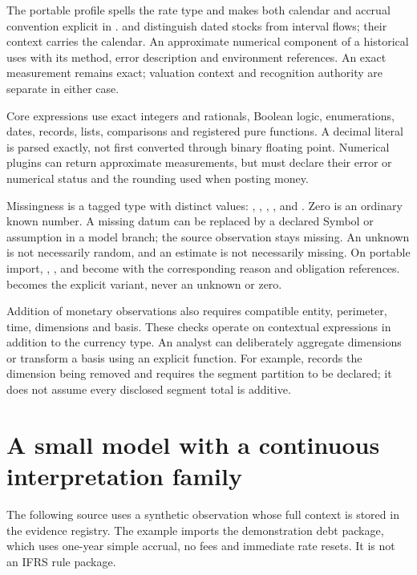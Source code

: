 The portable profile spells the rate type  and makes
both calendar and accrual convention explicit in
.  and
\code{Flow<T, [start,end)>} distinguish dated stocks from interval flows;
their context carries the calendar. An approximate numerical component of a
historical  uses  with its method,
error description and environment references. An exact measurement remains
exact; valuation context and recognition authority are separate in either case.

Core expressions use exact integers and rationals, Boolean logic, enumerations,
dates, records, lists, comparisons and registered pure functions. A decimal
literal is parsed exactly, not first converted through binary floating point.
Numerical plugins can return approximate measurements, but must declare their
error or numerical status and the rounding used when posting money.

Missingness is a tagged type with distinct values: ,
, , , and
. Zero is an ordinary known number. A missing datum can
be replaced by a declared Symbol or assumption in a model branch; the source
observation stays missing. An unknown is not necessarily random, and an
estimate is not necessarily missing.
On portable import, , ,  and
 become  with the corresponding reason
and obligation references.  becomes the explicit
 variant, never an unknown or zero.

Addition of monetary observations also requires compatible entity, perimeter,
time, dimensions and basis. These checks operate on contextual expressions in
addition to the currency type. An analyst can deliberately aggregate dimensions
or transform a basis using an explicit function. For example,
 records the dimension being removed and requires
the segment partition to be declared; it does not assume every disclosed
segment total is additive.


\section{A small model with a continuous interpretation family}

The following source uses a synthetic observation whose full context is stored
in the evidence registry. The example imports the demonstration debt package,
which uses one-year simple accrual, no fees and immediate rate resets. It is
not an IFRS rule package.

